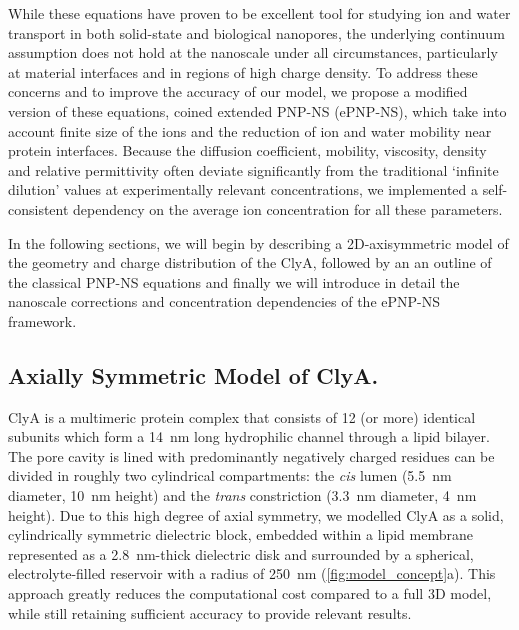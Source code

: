\documentclass[journal=ancac3, manuscript=article, etalmode=truncate,maxauthors=0]{achemso}
\begin{document}
While these equations have proven to be excellent tool for studying ion and water transport in both solid-state\cite{daiguji2004,lu2012,chaudhry2014,rempfer2016,lin2016}
and biological nanopores,\cite{eisenberg1996,simakov2010,pederson2015} the underlying continuum assumption does not hold at the nanoscale under all circumstances,
particularly at material interfaces\cite{vo2016} and in regions of high charge density.\cite{corry2000}
To address these concerns and to improve the accuracy of our model, we propose a modified version of these equations, coined extended PNP-NS (ePNP-NS),
which take into account finite size of the ions\cite{borukhov1997,lu2011} and the reduction of ion and water mobility near protein interfaces.\cite{makarov1998, pronk2013}
Because the diffusion coefficient, mobility, viscosity, density\cite{} and relative permittivity\cite{gavish2016} often deviate significantly from the traditional `infinite dilution'
values at experimentally relevant concentrations, we implemented a self-consistent dependency on the average ion concentration for all these parameters.

In the following sections, we will begin by describing a 2D-axisymmetric model of the geometry and charge distribution of the ClyA,
followed by an an outline of the classical PNP-NS equations and finally we will introduce in detail the nanoscale corrections and concentration dependencies of the ePNP-NS framework.

\subsection{Axially Symmetric Model of ClyA.}

ClyA is a multimeric protein complex that consists of 12 (or more) identical subunits which form a \SI{14}{\nano\meter} long hydrophilic channel through a lipid bilayer.
The pore cavity is lined with predominantly negatively charged residues can be divided in roughly two cylindrical compartments:
the \textit{cis} lumen (\SI{5.5}{\nano\meter} diameter, \SI{10}{\nano\meter} height) and
the \textit{trans} constriction (\SI{3.3}{\nano\meter} diameter, \SI{4}{\nano\meter} height).
Due to this high degree of axial symmetry, we modelled ClyA as a solid, cylindrically symmetric dielectric block,
embedded within a lipid membrane represented as a \SI{2.8}{\nano\meter}-thick\cite{kucerka2011} dielectric disk 
and surrounded by a spherical, electrolyte-filled reservoir with a radius of \SI{250}{\nano\meter} (\cref{fig:model_concept}a).\cite{lu2012,pederson2015}
This approach greatly reduces the computational cost compared to a full 3D model, while still retaining sufficient accuracy to provide relevant results. 
\end{document}
